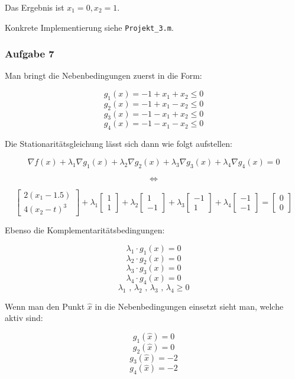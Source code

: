 \documentclass[a4paper, 12pt]{report}
\begin{document}
Das Ergebnis ist $x_1 = 0, x_2 = 1$.

Konkrete Implementierung siehe \lstinline[basicstyle=\ttfamily\color{black}]|Projekt_3.m|.

\subsubsection{Aufgabe 7}

Man bringt die Nebenbedingungen zuerst in die Form:

$$g_1(x) = -1 + x_1 + x_2 \leq 0$$
$$g_2(x) = -1 + x_1 - x_2 \leq 0$$
$$g_3(x) = -1 - x_1 + x_2 \leq 0$$
$$g_4(x) = -1 - x_1 - x_2 \leq 0$$

Die Stationaritätsgleichung lässt sich dann wie folgt aufstellen:

$$\nabla  f(x) + \lambda_1\nabla g_1(x) + \lambda_2\nabla g_2(x) + \lambda_3\nabla g_3(x) + \lambda_4\nabla g_4(x) = 0$$

$$\Leftrightarrow$$

$$\begin{bmatrix}2(x_1 - 1.5)\\4(x_2 - t)^3\end{bmatrix} + \lambda_1 \begin{bmatrix}1\\1\end{bmatrix} + \lambda_2 \begin{bmatrix}1\\-1\end{bmatrix} + \lambda_3 \begin{bmatrix}-1\\1\end{bmatrix} + \lambda_4 \begin{bmatrix}-1\\-1\end{bmatrix} = \begin{bmatrix}0\\0\end{bmatrix}$$

Ebenso die Komplementaritätsbedingungen:

$$\lambda_1\cdot g_1(x) = 0$$
$$\lambda_2\cdot g_2(x) = 0$$
$$\lambda_3\cdot g_3(x) = 0$$
$$\lambda_4\cdot g_4(x) = 0$$
$$\lambda_1 \text{ , } \lambda_2 \text{ , } \lambda_3 \text{ , } \lambda_4 \geq 0$$

Wenn man den Punkt $\hat{x}$ in die Nebenbedingungen einsetzt sieht man, welche aktiv sind:

$$g_1(\hat{x}) = 0$$
$$g_2(\hat{x}) = 0$$
$$g_3(\hat{x}) = -2$$
$$g_4(\hat{x}) = -2$$
\end{document}
